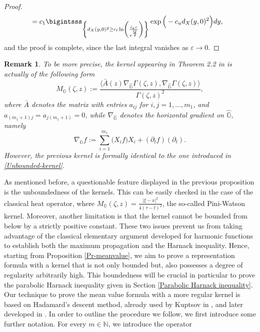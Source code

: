 \documentclass[11pt,a4paper]{article}
\newtheorem{remark}[theorem]{\bf Remark}
\numberwithin{equation}{section}
\newcommand{\N}{\mathbb{N}}
\def \GG {{\mathbb{G}}}
\def \p {\partial}
\def \G {{\Gamma}}
\def \e {{\varepsilon}}
\def \t {{\tau}}
\def \x {{\xi}}
\def \z {{\zeta}}
\begin{document}
{\begin{proof}
\begin{equation}
\begin{aligned}
			&=c_1 \bigintsss_{\left\{d_X(y,0)^2\geq c_l \ln\left(\frac{\tilde c_\e r}{\e^\frac{Q}{2}}\right) \right\}} \exp{\Big(-c_u d_X(y,0)^2\Big)} dy,
		\end{aligned}
	\end{equation}
	and the proof is complete, since the last integral vanishes as $\e\to 0$.
\end{proof}
\begin{remark}
	To be more precise, the kernel appearing in Theorem 2.2 in \cite{pallara2023meanvalueformulasclassical} is actually of the following form
	\begin{equation}\label{A-kernel}
		M_\GG(\z,z):=\frac{\langle \bar A(z)\nabla_{\widehat \GG} \G(\z,z),\nabla_{\widehat \GG}\G(\z,z) \rangle}{{\G(\z,z)}^2},
	\end{equation}
	where $\bar A$ denotes the matrix with entries $a_{ij}$ for $i,j=1,\ldots,m_1$, and $a_{(m_1+1)j}=a_{j(m_1+1)}=0$, while $\nabla_{\widehat \GG}$ denotes the horizontal gradient on $\widehat \GG$, namely
	\begin{equation}
		 \nabla_{\GG}f:=\sum_{i=1}^{m_1} \big(X_i f\big)X_i + (\p_t f)(\p_t).
	\end{equation}	
	However, the previous kernel is formally identical to the one introduced in \eqref{Unbounded-kernel}.	
\end{remark}
As mentioned before, a questionable feature displayed in the previous proposition is the unboundedness of the kernels. This can be easily checked in the case of the classical heat operator, where $M_\GG(\z,z)=\frac{|\x-x|^2}{4(\t-t)^2}$, the so-called Pini-Watson kernel. Moreover, another limitation is that the kernel cannot be bounded from below by a strictly positive constant. These two issues prevent us from taking advantage of the classical elementary argument developed for harmonic functions to establish both the maximum propagation and the Harnack inequality.  Hence, starting from Proposition \ref{Pr-meanvalue}, we aim to prove a representation formula with a kernel that is not only bounded but, also possesses a degree of regularity arbitrarily high. This boundedness will be crucial in particular to prove the parabolic Harnack inequality given in Section \ref{Parabolic Harnack inequality}. Our technique to prove the mean value formula with a more regular kernel is based on Hadamard's descent method, already used by Kuptsov in \cite{Kupcov}, and later developed in \cite{CupiniLanconelli2021,GarofaloLanconelli-1989, GarofaloLanconelli, malagoli, rebucci24}. In order to outline the procedure we follow, we first introduce some further notation. For every $m \in \N$, we introduce the operator
}
\end{document}
